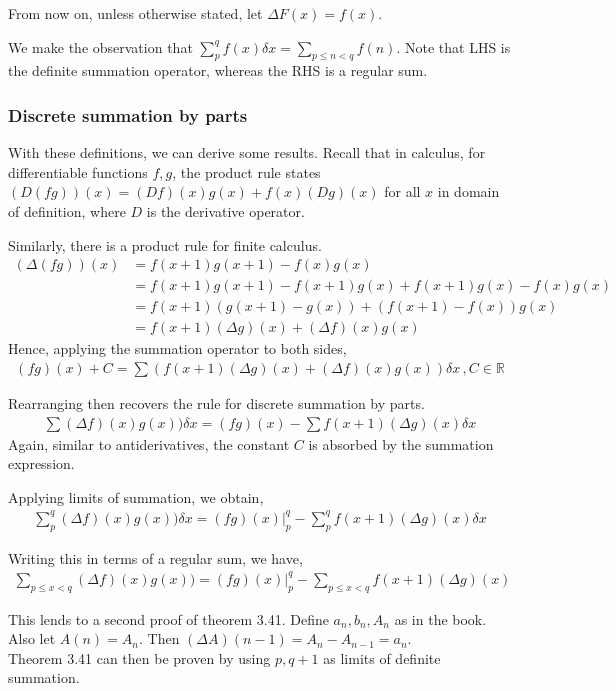 \documentclass{article}
\begin{document}
From now on, unless otherwise stated, let $\Delta F(x) = f(x)$.

We make the observation that $\sum_p^q f(x) \delta x = \sum_{p\leq n < q}f(n)$. Note that LHS is the definite summation operator, whereas the RHS is a regular sum.

\subsubsection{Discrete summation by parts}
With these definitions, we can derive some results. Recall that in calculus, for differentiable functions $f,g$, the product rule states $(D(fg))(x) = (Df)(x)g(x) + f(x)(Dg)(x)$ for all $x$ in domain of definition, where $D$ is the derivative operator.

Similarly, there is a product rule for finite calculus.
\begin{align*}
	(\Delta (fg))(x) &= f(x+1)g(x+1) - f(x)g(x)\\
	&= f(x+1)g(x+1) - f(x+1)g(x) + f(x+1)g(x) - f(x)g(x)\\
	&= f(x+1)(g(x+1)-g(x)) + (f(x+1)-f(x))g(x)\\
	&= f(x+1)(\Delta g)(x) + (\Delta f)(x)g(x)
\end{align*}
Hence, applying the summation operator to both sides,
\begin{align*}
	(fg)(x) + C = \sum (f(x+1)(\Delta g)(x) + (\Delta f)(x)g(x)) \delta x\, , C\in \mathbb{R}
\end{align*}

Rearranging then recovers the rule for discrete summation by parts.
\begin{align*}
	\sum (\Delta f)(x)g(x)) \delta x = (fg)(x) - \sum f(x+1)(\Delta g)(x) \delta x
\end{align*}
Again, similar to antiderivatives, the constant $C$ is absorbed by the summation expression.

Applying limits of summation, we obtain,
\begin{align*}
	\sum_p^q (\Delta f)(x)g(x)) \delta x = (fg)(x)|_p^q - \sum_p^q f(x+1)(\Delta g)(x) \delta x
\end{align*}

Writing this in terms of a regular sum, we have,
\begin{align*}
	\sum_{p\leq x < q} (\Delta f)(x)g(x)) = (fg)(x)|_p^q - \sum_{p\leq x < q} f(x+1)(\Delta g)(x)
\end{align*}

This lends to a second proof of theorem 3.41.
Define $a_n,b_n,A_n$ as in the book. Also let $A(n) = A_n$. Then $(\Delta A)(n-1) = A_n - A_{n-1} = a_n$.\\
Theorem 3.41 can then be proven by using $p, q+1$ as limits of definite summation.
\end{document}
